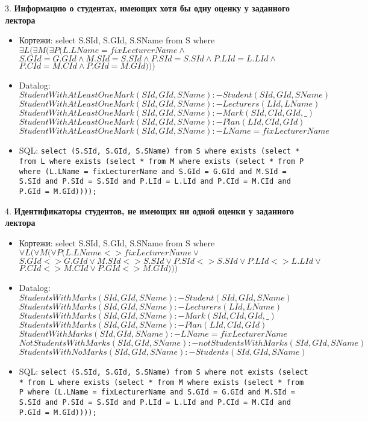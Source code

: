 \documentclass[11pt,a4paper,oneside]{article}
\begin{document}
3. \textbf{Информацию о студентах, имеющих хотя бы одну оценку у заданного лектора}
\begin{itemize}
\item Кортежи: select S.SId, S.GId, S.SName from S where $\exists L (\exists M (\exists P (L.LName = fixLecturerName \land$ $S.GId = G.GId \land M.SId = S.SId \land P.SId = S.SId \land P.LId = L.LId \land$ $P.CId = M.CId \land P.GId = M.GId)))$
\item Datalog:
$StudentWithAtLeastOneMark(SId, GId, SName) :- Student(SId, GId, SName)$
\newline
$StudentWithAtLeastOneMark(SId, GId, SName) :- Lecturers(LId, LName)$
\newline
$StudentWithAtLeastOneMark(SId, GId, SName) :- Mark(SId, CId, GId, \_)$
\newline
$StudentWithAtLeastOneMark(SId, GId, SName) :- Plan(LId, CId, GId)$
\newline
$StudentWithAtLeastOneMark(SId, GId, SName) :- LName = fixLecturerName$

\item SQL: \texttt{select (S.SId, S.GId, S.SName) from S where exists (select * from L where exists (select * from M where exists (select * from P where (L.LName = fixLecturerName and S.GId = G.GId and M.SId = S.SId and P.SId = S.SId and P.LId = L.LId and P.CId = M.CId and P.GId = M.GId))));}
\end{itemize}

4. \textbf{Идентификаторы студентов, не имеющих ни одной оценки у заданного лектора}
\begin{itemize}
\item Кортежи: select S.SId, S.GId, S.SName from S where $\forall L (\forall M (\forall P (L.LName <> fixLecturerName \lor$ $S.GId <> G.GId \lor M.SId <> S.SId \lor P.SId <> S.SId \lor P.LId <> L.LId \lor$ $P.CId <> M.CId \lor P.GId <> M.GId)))$
\item Datalog: 
$StudentsWithMarks(SId, GId, SName) :- Student(SId, GId, SName)$
\newline
$StudentsWithMarks(SId, GId, SName) :- Lecturers(LId, LName)$
\newline
$StudentsWithMarks(SId, GId, SName) :- Mark(SId, CId, GId, \_)$
\newline
$StudentsWithMarks(SId, GId, SName) :- Plan(LId, CId, GId)$
\newline
$StudentWithMarks(SId, GId, SName) :- LName = fixLecturerName$
\newline
$NotStudentsWithMarks(SId, GId, SName) :- not StudentsWithMarks(SId, GId, SName)$
\newline
$StudentsWithNoMarks(SId, GId, SName) :- Students(SId, GId, SName)$

\item SQL: \texttt{select (S.SId, S.GId, S.SName) from S where not exists (select * from L where exists (select * from M where exists (select * from P where (L.LName = fixLecturerName and S.GId = G.GId and M.SId = S.SId and P.SId = S.SId and P.LId = L.LId and P.CId = M.CId and P.GId = M.GId))));}
\end{itemize}
\end{document}
